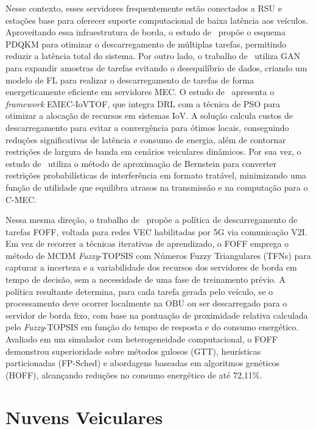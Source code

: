 Nesse contexto, esses servidores frequentemente estão conectados a \gls{RSU} e estações base para oferecer suporte computacional de baixa latência aos veículos. Aproveitando essa infraestrutura de borda, o estudo de~\cite{zhao2025} propõe o esquema \gls{PDQKM} para otimizar o descarregamento de múltiplas tarefas, permitindo reduzir a latência total do sistema. Por outro lado, o trabalho de~\cite{wu2025} utiliza \gls{GAN} para expandir amostras de tarefas evitando o desequilíbrio de dados, criando um modelo de \gls{FL} para realizar o descarregamento de tarefas de forma energeticamente eficiente em servidores \gls{MEC}. O estudo de~\cite{mohammad2025} apresenta o \textit{framework} EMEC-IoVTOF, que integra \gls{DRL} com a técnica de \gls{PSO} para otimizar a alocação de recursos em sistemas \gls{IoV}. A solução calcula custos de descarregamento para evitar a convergência para ótimos locais, conseguindo reduções significativas de latência e consumo de energia, além de contornar restrições de largura de banda em cenários veiculares dinâmicos. Por sua vez, o estudo de~\cite{liu2025} utiliza o método de aproximação de Bernstein para converter restrições probabilísticas de interferência em formato tratável, minimizando uma função de utilidade que equilibra atrasos na transmissão e na computação para o \gls{C-MEC}.

Nessa mesma direção, o trabalho de~\cite{vieira2025} propõe a política de descarregamento de tarefas \gls{FOFF}, voltada para redes \gls{VEC} habilitadas por \gls{5G} via comunicação \gls{V2I}. Em vez de recorrer a técnicas iterativas de aprendizado, o FOFF emprega o método de \gls{MCDM} \textit{Fuzzy}-\gls{TOPSIS} com Números Fuzzy Triangulares (TFNs) para capturar a incerteza e a variabilidade dos recursos dos servidores de borda em tempo de decisão, sem a necessidade de uma fase de treinamento prévio. A política resultante determina, para cada tarefa gerada pelo veículo, se o processamento deve ocorrer localmente na \gls{OBU} ou ser descarregado para o servidor de borda fixo, com base na pontuação de proximidade relativa calculada pelo \textit{Fuzzy}-\gls{TOPSIS} em função do tempo de resposta e do consumo energético. Avaliado em um simulador com heterogeneidade computacional, o \gls{FOFF} demonstrou superioridade sobre métodos gulosos (GTT), heurísticas particionadas (FP-Sched) e abordagens baseadas em algoritmos genéticos (HOFF), alcançando reduções no consumo energético de até 72,11\%.

\section*{Nuvens Veiculares}

